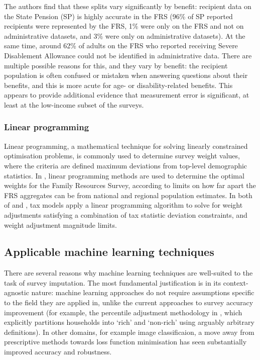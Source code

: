 \documentclass[10pt,journal,compsoc]{IEEEtran}
\begin{document}
The authors find that these splits vary significantly by benefit: recipient data on the State Pension (SP) is highly accurate in the FRS (96\% of SP reported recipients were represented by the FRS, 1\% were only on the FRS and not on administrative datasets, and 3\% were only on administrative datasets). At the same time, around 62\% of adults on the FRS who reported receiving Severe Disablement Allowance could not be identified in administrative data. There are multiple possible reasons for this, and they vary by benefit: the recipient population is often confused or mistaken when answering questions about their benefits, and this is more acute for age- or disability-related benefits. This appears to provide additional evidence that measurement error is significant, at least at the low-income subset of the surveys.

\subsubsection{Linear programming}

Linear programming, a mathematical technique for solving linearly constrained optimisation problems, is commonly used to determine survey weight values, where the criteria are defined maximum deviations from top-level demographic statistics. In \cite{frs_weighting_review}, linear programming methods are used to determine the optimal weights for the Family Resources Survey, according to limits on how far apart the FRS aggregates can be from national and regional population estimates. In both of \cite{tpc_microsim_docs} and \cite{taxdata_github}, tax models apply a linear programming algorithm to solve for weight adjustments satisfying a combination of tax statistic deviation constraints, and weight adjustment magnitude limits.

\subsection{Applicable machine learning techniques}

There are several reasons why machine learning techniques are well-suited to the task of survey imputation. The most fundamental justification is in its context-agnostic nature: machine learning approaches do not require assumptions specific to the field they are applied in, unlike the current approaches to survey accuracy improvement (for example, the percentile adjustment methodology in \cite{ons_spi_version_2}, which explicitly partitions households into `rich' and `non-rich' using arguably arbitrary definitions). In other domains, for example image classificaion, a move away from prescriptive methods towards loss function minimisation has seen substantially improved accuracy and robustness.\cite{image_classification_survey}
\end{document}
